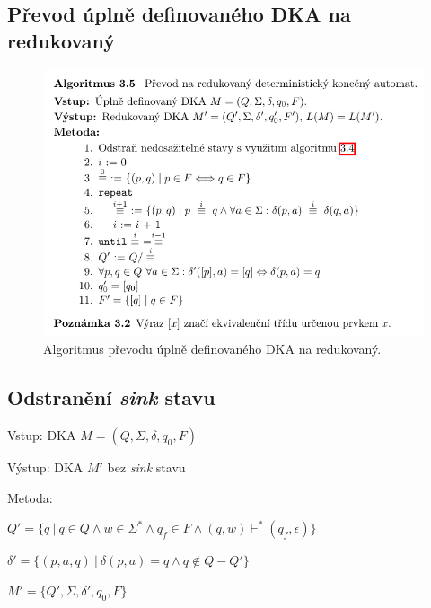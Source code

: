 \subsection{Převod úplně definovaného DKA na redukovaný}

\begin{figure}[H]
    \centering
    \includegraphics[width=0.9\linewidth]{prevod_na_redukovany_dka.pdf}
    \caption{Algoritmus převodu úplně definovaného DKA na redukovaný.}
\end{figure}

\subsection{Odstranění \textit{sink} stavu}

\begin{compactitem}
    \item Vstup: DKA $M = (Q, \Sigma, \delta, q_0, F)$
    \item Výstup: DKA $M'$ bez \textit{sink} stavu
    \item Metoda: \begin{compactenum}
        \item $Q' = \{ q ~|~ q \in Q \land w \in \Sigma^* \land q_f \in F \land (q, w) \vdash^* (q_f, \epsilon) \}$
        \item $\delta' = \{ (p, a, q) ~|~ \delta(p, a) = q \land q \not\in Q - Q' \}$
        \item $M' = \{ Q', \Sigma, \delta', q_0, F \}$
    \end{compactenum}
\end{compactitem}

